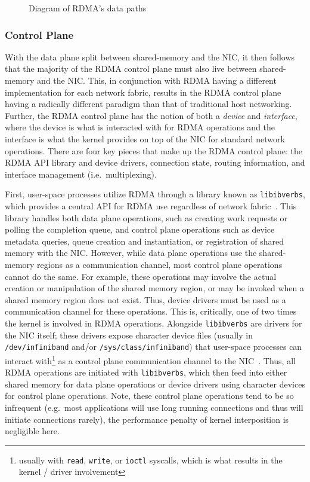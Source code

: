 \documentclass[12pt,titlepage]{article}
\begin{document}
\begin{figure}
	\resizebox{\linewidth}{!}{
		\begin{tikzpicture}[x=0.75pt,y=0.75pt,yscale=-1,xscale=1]
			
		\end{tikzpicture}
	}
	\caption{Diagram of RDMA's data paths}
\end{figure}

\subsubsection{Control Plane}\label{subsubsec:Control Plane}
With the data plane split between shared-memory and the NIC, it then follows that the majority of the RDMA control plane must also live between shared-memory and the NIC\@.
This, in conjunction with RDMA having a different implementation for each network fabric, results in the RDMA control plane having a radically different paradigm than that of traditional host networking.
Further, the RDMA control plane has the notion of both a \textit{device} and \textit{interface}, where the device is what is interacted with for RDMA operations and the interface is what the kernel provides on top of the NIC for standard network operations.
There are four key pieces that make up the RDMA control plane: the RDMA API library and device drivers, connection state, routing information, and interface management (i.e.\ multiplexing).

First, user-space processes utilize RDMA through a library known as \texttt{libibverbs}, which provides a central API for RDMA use regardless of network fabric~\cite{rdmacoredocumentation}.
This library handles both data plane operations, such as creating work requests or polling the completion queue, and control plane operations such as device metadata queries, queue creation and instantiation, or registration of shared memory with the NIC\@.
However, while data plane operations use the shared-memory regions as a communication channel, most control plane operations cannot do the same.
For example, these operations may involve the actual creation or manipulation of the shared memory region, or may be invoked when a shared memory region does not exist.
Thus, device drivers must be used as a communication channel for these operations.
This is, critically, one of two times the kernel is involved in RDMA operations.
Alongside \texttt{libibverbs} are drivers for the NIC itself;
these drivers expose character device files (usually in \texttt{/dev/infiniband} and/or \texttt{/sys/class/infiniband}) that user-space processes can interact with\footnote{usually with \texttt{read}, \texttt{write}, or \texttt{ioctl} syscalls, which is what results in the kernel / driver involvement} as a control plane communication channel to the NIC~\cite{linuxkernellibibverbs}.
Thus, all RDMA operations are initiated with \texttt{libibverbs}, which then feed into either shared memory for data plane operations or device drivers using character devices for control plane operations.
Note, these control plane operations tend to be so infrequent (e.g.\ most applications will use long running connections and thus will initiate connections rarely), the performance penalty of kernel interposition is negligible here.
\end{document}
